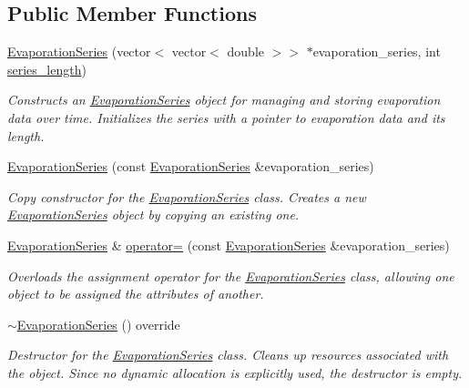 \subsection*{Public Member Functions}
\begin{DoxyCompactItemize}
\item 
\mbox{\hyperlink{classEvaporationSeries_af0903d8555a148f9bf45f915877120b3}{Evaporation\+Series}} (vector$<$ vector$<$ double $>$$>$ $\ast$evaporation\+\_\+series, int \mbox{\hyperlink{classCatchment_a2d4994220f63b876348b4ce4892bc6d3}{series\+\_\+length}})
\begin{DoxyCompactList}\small\item\em Constructs an {\ttfamily \mbox{\hyperlink{classEvaporationSeries}{Evaporation\+Series}}} object for managing and storing evaporation data over time. Initializes the series with a pointer to evaporation data and its length. \end{DoxyCompactList}\item 
\mbox{\hyperlink{classEvaporationSeries_aa8d8cd8bbc0fd5b368b748cb090ad414}{Evaporation\+Series}} (const \mbox{\hyperlink{classEvaporationSeries}{Evaporation\+Series}} \&evaporation\+\_\+series)
\begin{DoxyCompactList}\small\item\em Copy constructor for the {\ttfamily \mbox{\hyperlink{classEvaporationSeries}{Evaporation\+Series}}} class. Creates a new {\ttfamily \mbox{\hyperlink{classEvaporationSeries}{Evaporation\+Series}}} object by copying an existing one. \end{DoxyCompactList}\item 
\mbox{\hyperlink{classEvaporationSeries}{Evaporation\+Series}} \& \mbox{\hyperlink{classEvaporationSeries_ae9f1fc3bb0bf32db12dcc531c6af2e6b}{operator=}} (const \mbox{\hyperlink{classEvaporationSeries}{Evaporation\+Series}} \&evaporation\+\_\+series)
\begin{DoxyCompactList}\small\item\em Overloads the assignment operator for the {\ttfamily \mbox{\hyperlink{classEvaporationSeries}{Evaporation\+Series}}} class, allowing one object to be assigned the attributes of another. \end{DoxyCompactList}\item 
\mbox{\hyperlink{classEvaporationSeries_a201a00eaaadc9c523d544e0d6a4c50e5}{$\sim$\+Evaporation\+Series}} () override
\begin{DoxyCompactList}\small\item\em Destructor for the {\ttfamily \mbox{\hyperlink{classEvaporationSeries}{Evaporation\+Series}}} class. Cleans up resources associated with the object. Since no dynamic allocation is explicitly used, the destructor is empty. \end{DoxyCompactList}\item 
$$
\end{DoxyCompactItemize}
